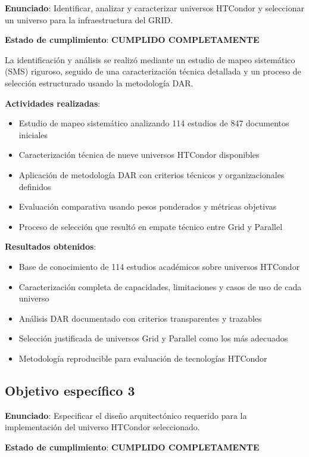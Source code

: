 \textbf{Enunciado}: Identificar, analizar y caracterizar universos HTCondor y seleccionar un universo para la infraestructura del GRID.

\textbf{Estado de cumplimiento}: \textbf{CUMPLIDO COMPLETAMENTE}

La identificación y análisis se realizó mediante un estudio de mapeo sistemático (SMS) riguroso, seguido de una caracterización técnica detallada y un proceso de selección estructurado usando la metodología DAR.

\textbf{Actividades realizadas}:
\begin{itemize}
    \item Estudio de mapeo sistemático analizando 114 estudios de 847 documentos iniciales
    \item Caracterización técnica de nueve universos HTCondor disponibles
    \item Aplicación de metodología DAR con criterios técnicos y organizacionales definidos
    \item Evaluación comparativa usando pesos ponderados y métricas objetivas
    \item Proceso de selección que resultó en empate técnico entre Grid y Parallel
\end{itemize}

\textbf{Resultados obtenidos}:
\begin{itemize}
    \item Base de conocimiento de 114 estudios académicos sobre universos HTCondor
    \item Caracterización completa de capacidades, limitaciones y casos de uso de cada universo
    \item Análisis DAR documentado con criterios transparentes y trazables
    \item Selección justificada de universos Grid y Parallel como los más adecuados
    \item Metodología reproducible para evaluación de tecnologías HTCondor
\end{itemize}

\subsection{Objetivo específico 3}
\noindent

\textbf{Enunciado}: Especificar el diseño arquitectónico requerido para la implementación del universo HTCondor seleccionado.

\textbf{Estado de cumplimiento}: \textbf{CUMPLIDO COMPLETAMENTE}

